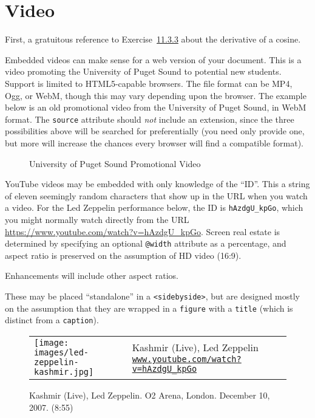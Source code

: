 \documentclass[10pt,]{article}
\theoremstyle{plain}
\theoremstyle{definition}
\theoremstyle{definition}
\theoremstyle{definition}
\theoremstyle{definition}
\theoremstyle{definition}
\theoremstyle{definition}
\numberwithin{equation}{section}
\begin{document}
\section[{Video}]{Video}\label{section-video}
\hypertarget{p-492}{}%
First, a gratuitous reference to Exercise~\hyperlink{exercises-cosine-derivative}{11.3.3} about the derivative of a cosine.%
\par
\hypertarget{p-493}{}%
Embedded videos can make sense for a web version of your document. This is a video promoting the University of Puget Sound to potential new students.  Support is limited to HTML5-capable browsers.  The file format can be MP4, Ogg, or WebM, though this may vary depending upon the browser.  The example below is an old promotional video from the University of Puget Sound, in WebM format.  The \lstinline?source? attribute should \emph{not} include an extension, since the three possibilities above will be searched for preferentially (you need only provide one, but more will increase the chances every browser will find a compatible format).%
\begin{figure}
\centering
[video]\caption{University of Puget Sound Promotional Video\label{figure-26}}
\end{figure}
\hypertarget{p-494}{}%
YouTube videos may be embedded with only knowledge of the ``ID''.  This a string of eleven seemingly random characters that show up in the URL when you watch a video.  For the Led Zeppelin performance below, the ID is \lstinline?hAzdgU_kpGo?, which you might normally watch directly from the URL \url{https://www.youtube.com/watch?v=hAzdgU_kpGo}.  Screen real estate is determined by specifying an optional \lstinline?@width? attribute as a percentage, and aspect ratio is preserved on the assumption of HD video (16:9).%
\par
\hypertarget{p-495}{}%
Enhancements will include other aspect ratios.%
\par
\hypertarget{p-496}{}%
These may be placed ``standalone'' in a \lstinline?<sidebyside>?, but are designed mostly on the assumption that they are wrapped in a \lstinline?figure? with a \lstinline?title? (which is distinct from a \lstinline?caption?).%
\begin{figure}
\centering
{}\begin{tabular}{m{.2\linewidth}m{.6\linewidth}}
\texttt{[image: images/led-zeppelin-kashmir.jpg]}&%
Kashmir (Live), Led Zeppelin\newline%
\href{https://www.youtube.com/watch?v=hAzdgU_kpGo}{\texttt{\nolinkurl{www.youtube.com/watch?v=hAzdgU_kpGo}}}
\end{tabular}
\caption{Kashmir (Live), Led Zeppelin. O2 Arena, London. December 10, 2007. (8:55)\label{figure-27}}
\end{figure}
\end{document}
